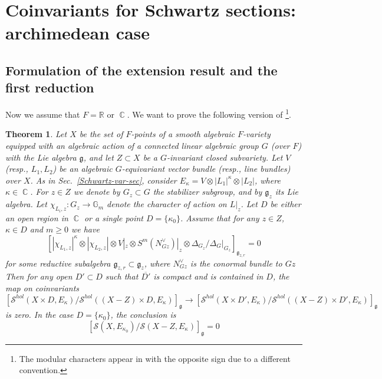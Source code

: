 \documentclass[12pt,reqno]{amsart}
\DeclareMathOperator\C{\mathbb C}
\newtheorem{theorem}{Theorem}[section]
\theoremstyle{definition}
\theoremstyle{remark}
\numberwithin{equation}{section}
\newcommand{\De}{\Delta}
\newcommand{\ot}{\otimes}
\renewcommand{\SS}{{\mathcal S}}
\newcommand{\sub}{\subset}
\newcommand{\ov}{\overline}
\newcommand{\G}{{\mathbb G}}
\newcommand{\fg}{{\mathfrak g}}
\newcommand{\R}{{\mathbb R}}
\begin{document}
\section{Coinvariants for Schwartz sections: archimedean case}\label{coinv-arch-sec}

\subsection{Formulation of the extension result and the first reduction}

Now we assume that $F=\R$ or $\C$.
We want to prove the following version of \cite[Thm.\ B.0.2]{AG-sm-tr}\footnote{The modular characters appear in \cite[Thm.\ B.0.2]{AG-sm-tr} with the opposite sign
due to a different convention.}. 

\begin{theorem}\label{coinv-thm} 
Let $X$ be the set of $F$-points of a smooth algebraic $F$-variety equipped with an algebraic action of a connected linear algebraic group $G$ (over $F$) with
the Lie algebra $\fg$,
and let $Z\sub X$ be a $G$-invariant closed subvariety. Let $V$ (resp., $L_1,L_2$) be an algebraic $G$-equivariant vector bundle (resp., line bundles) over $X$.
As in Sec.\ \ref{Schwartz-var-sec}, consider $E_{\kappa}=V\ot |L_1|^{\kappa}\ot |L_2|$, where $\kappa\in \C$.
For $z\in Z$ we denote by $G_z\sub G$ the stabilizer subgroup, and by $\fg_z$ its Lie algebra.
Let $\chi_{L_i,z}:G_z\to \G_m$ denote the character of action on $L|_z$.
Let $D$ be either an open region in $\C$ or a single point $D=\{\kappa_0\}$.
Assume that for any $z\in Z$, $\kappa\in D$ and $m\ge 0$ we have
$$[|\chi_{L_1,z}|^{\kappa}\ot |\chi_{L_2,z}|\ot V|_z\ot S^m(N^\vee_{Gz})|_z\ot \De_{G_z}/\De_G|_{G_z}]_{\fg_{z,r}}=0$$
for some reductive subalgebra $\fg_{z,r}\sub \fg_z$, where $N^\vee_{Gz}$ is the conormal bundle to $Gz$
Then for any open $D'\sub D$ such that $\ov{D'}$ is compact and is contained in $D$, the map on coinvariants
$$[\SS^{hol}(X\times D,E_{\kappa})/\SS^{hol}((X-Z)\times D,E_{\kappa})]_{\fg}\to [\SS^{hol}(X\times D',E_{\kappa})/\SS^{hol}((X-Z)\times D',E_{\kappa})]_{\fg}$$
is zero. In the case $D=\{\kappa_0\}$, the conclusion is
$$[\SS(X,E_{\kappa_0})/\SS(X-Z,E_{\kappa})]_{\fg}=0$$
\end{theorem}
\end{document}
